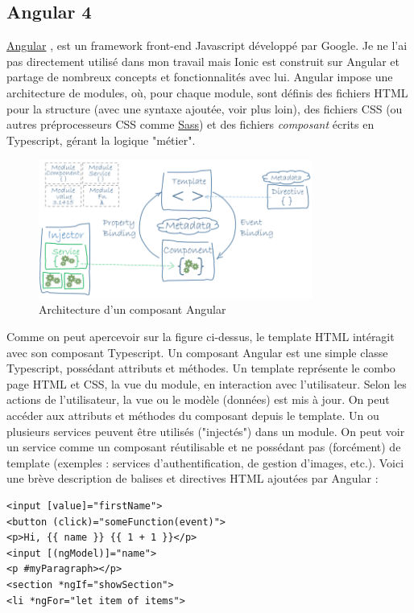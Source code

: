 \documentclass[a4paper, 12pt]{article}
\newenvironment{code}{\captionsetup{type=listing}}{}
\begin{document}
\subsection{Angular 4}
\href{https://angular.io/}{Angular} \cite{ref15}, \cite{ref21} est un framework front-end Javascript développé par Google.
Je ne l'ai pas directement utilisé dans mon travail mais Ionic est construit sur Angular et partage de nombreux concepts
et fonctionnalités avec lui.
Angular impose une architecture de modules, où, pour chaque module, sont définis des fichiers HTML pour la structure
(avec une syntaxe ajoutée, voir plus loin), des fichiers CSS (ou autres préprocesseurs CSS comme
\href{http://sass-lang.com/}{Sass}) et des fichiers \textit{composant} écrits en Typescript, gérant la logique "métier".
\begin{figure}
    \begin{center}
        \includegraphics[width=0.8\textwidth]{images/angular2.png}
    \end{center}
    \caption{Architecture d'un composant Angular \cite{ref13}}
\end{figure}
Comme on peut apercevoir sur la figure ci-dessus, le template HTML intéragit avec son composant Typescript.
Un composant Angular est une simple classe Typescript, possédant attributs et méthodes.
Un template représente le combo page HTML et CSS, la vue du module, en interaction avec l'utilisateur.
Selon les actions de l'utilisateur, la vue ou le modèle (données) est mis à jour. On peut accéder aux attributs et méthodes
du composant depuis le template. Un ou plusieurs services peuvent être utilisés ("injectés") dans un module. On peut
voir un service comme un composant réutilisable et ne possédant pas (forcément) de template (exemples : services
d'authentification, de gestion d'images, etc.).
\bigbreak
Voici une brève description de balises et directives HTML ajoutées par Angular :
\begin{code}
    \begin{verbatim}
<input [value]="firstName">
<button (click)="someFunction(event)">
<p>Hi, {{ name }} {{ 1 + 1 }}</p>
<input [(ngModel)]="name">
<p #myParagraph></p>
<section *ngIf="showSection">
<li *ngFor="let item of items">
    \end{verbatim}
    \caption{Syntaxe HTML avec Angular}
\end{code}
\end{document}
